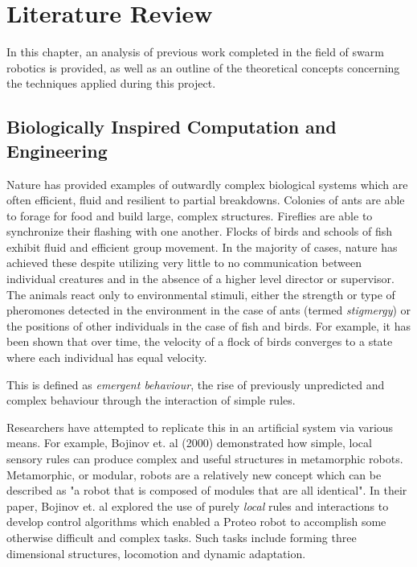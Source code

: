 \chapter{Literature Review}
\label{chap:LiteratureReview}

In this chapter, an analysis of previous work completed in the field of swarm robotics is provided, as well as an outline of the theoretical concepts concerning the techniques applied during this project.

\section{Biologically Inspired Computation and Engineering}

Nature has provided examples of outwardly complex biological systems which are often efficient, fluid
and resilient to partial breakdowns. Colonies of ants are able to forage for food and build large, complex
structures. Fireflies are able to synchronize their flashing with one another. Flocks of birds and schools of fish exhibit fluid
and efficient group movement. In the majority of cases, nature has achieved these despite utilizing very little to
no communication between individual creatures and in the absence of a higher level director or supervisor.
The animals react only to environmental stimuli, either the strength or type of pheromones detected in the environment in the case of
ants (termed \textsl{stigmergy}) or the positions of other individuals in the case of fish and birds. For example, it has been shown that over time, the velocity of a flock of birds converges to a state where each individual has equal velocity. \cite{cucker-smale}

This is defined as \textsl{emergent behaviour}, the rise of previously unpredicted and complex behaviour through the interaction of simple rules.

Researchers have attempted to replicate this in an artificial system via various means. For example, Bojinov et. al (2000) demonstrated how simple, local sensory rules can produce complex and useful structures in metamorphic robots. \cite{Bojinov2000}  Metamorphic, or modular, robots are a relatively new concept which can be described as "a robot that is composed of modules that are all identical". \cite{Yim} In their paper, Bojinov et. al explored the use of purely \textit{local} rules and interactions to develop control algorithms which enabled a Proteo robot to accomplish some otherwise difficult and complex tasks. Such tasks include forming three dimensional structures, locomotion and dynamic adaptation.

